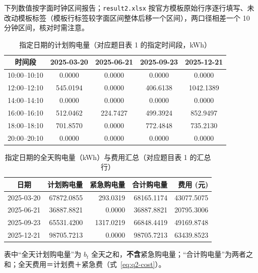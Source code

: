 下列数值按字面时钟区间报告；\texttt{result2.xlsx} 按官方模板原始行序逐行填写、未改动模板标签（模板行标签较字面区间整体后移一个区间），两口径相差一个 10 分钟区间，核对时需注意。

\begin{table}[H]
  \centering
  \caption{指定日期的计划购电量（对应题目表 1 的指定时间段，kWh）}
  \label{tab:q2-t1}
  \small
  \setlength{\tabcolsep}{5pt}
  \begin{tabular}{|c|c|c|c|c|}
    \hline
    时间段 & 2025-03-20 & 2025-06-21 & 2025-09-23 & 2025-12-21 \\ \hline
    10:00--10:10 & 0.0000 & 0.0000 & 0.0000 & 0.0000 \\ \hline
    12:00--12:10 & 545.0194 & 0.0000 & 406.6138 & 1042.1389 \\ \hline
    14:00--14:10 & 0.0000 & 0.0000 & 0.0000 & 0.0000 \\ \hline
    16:00--16:10 & 512.0462 & 224.7427 & 499.3924 & 852.9497 \\ \hline
    18:00--18:10 & 701.8570 & 0.0000 & 772.4848 & 735.2130 \\ \hline
    20:00--20:10 & 0.0000 & 0.0000 & 0.0000 & 0.0000 \\ \hline
  \end{tabular}
\end{table}

\begin{table}[H]
  \centering
  \caption{指定日期的全天购电量（kWh）与费用汇总（对应题目表 1 的汇总行）}
  \label{tab:q2-daysum}
  \small
  \setlength{\tabcolsep}{5pt}
  \begin{tabular}{|c|r|r|r|r|}
    \hline
    日期 & 计划购电量 & 紧急购电量 & 合计购电量 & 费用 (元) \\ \hline
    2025-03-20 & 67872.0855 & 293.0319 & 68165.1174 & 43077.5075 \\ \hline
    2025-06-21 & 36887.8821 & 0.0000 & 36887.8821 & 20795.3006 \\ \hline
    2025-09-23 & 65531.4200 & 1317.0219 & 66848.4419 & 49169.8748 \\ \hline
    2025-12-21 & 98705.7213 & 0.0000 & 98705.7213 & 63439.8523 \\ \hline
  \end{tabular}
\end{table}

表中``全天计划购电量''为 $b_t$ 全天之和，\textbf{不含}紧急购电量；``合计购电量''为两者之和；全天费用＝计划费＋紧急费（式~\eqref{eq:q2-cost}）。

